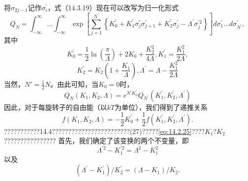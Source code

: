 将\(\sigma_{2j-1}\)记作\(\sigma_{i}^{\prime}\)，式（14.3.19）现在可以改写为归一化形式
\begin{equation}\tag{14.2.28}\label{eq:14.2.28}
Q _ { N } = \int _ { - \infty } ^{\infty} \ldots \int _ { - \infty } ^{\infty} \exp \left[ \sum _ { j = 1 } ^{N ^ { \prime} } \left\{ K _ { 0 } ^{\prime} + K _ { 1 } ^{\prime} \sigma _ { j } ^{\prime} \sigma _ { j + 1 } ^{\prime} + K _ { 2 } ^{\prime} \sigma _ { j } ^{\prime} - \Lambda ^{\prime} \sigma _ { j } ^{\prime 2} \right\} \right] d \sigma _ { 1 } ^{\prime} \ldots d \sigma _ { N ^{\prime} } ^{\prime} ,
\end{equation}
其中
\begin{equation}\tag{14.2.29}\label{eq:14.2.29}
K _ { 0 } ^{\prime} = \frac { 1 } { 2 } \ln \left( \frac { \pi } { \Lambda } \right) + 2 K _ { 0 } + \frac { K _ { 2 } ^{2} } { 4 \Lambda } ,  K _ { 1 } ^{\prime} = \frac { K _ { 1 } ^{2} } { 2 \Lambda } ,
\end{equation}
\begin{equation}\tag{14.2.30}\label{eq:14.2.30}
K _ { 2 } ^{\prime} = K _ { 2 } \left( 1 + \frac { K _ { 1 } } { \Lambda } \right) ,  \Lambda ^{\prime} = \Lambda - \frac { K _ { 1 } ^{2} } { 2 \Lambda }
\end{equation}
当然，\(N' = \frac{1}{2}N\)。由此可知，当\(K_0 = 0\)时，
\begin{equation}\tag{14.2.31}\label{eq:14.2.31}
Q _ { N } ( K _ { 1 } , K _ { 2 } , \Lambda ) = e ^{N ^ { \prime} K _ { 0 } ^{\prime} } Q _ { N ^{\prime} } ( K _ { 1 } ^{\prime} , K _ { 2 } ^{\prime} , \Lambda ^{\prime} )
\end{equation}
因此，对于每旋转子的自由能（以\(kT\)为单位），我们得到了递推关系
\begin{equation}\tag{14.2.32}\label{eq:14.2.32}
f ( K _ { 1 } , K _ { 2 } , \Lambda ) = - \frac { 1 } { 2 } K _ { 0 } ^{\prime} + \frac { 1 } { 2 } f ( K _ { 1 } ^{\prime} , K _ { 2 } ^{\prime} , \Lambda ^{\prime} ) .
\end{equation}
???????????14.4????????????????????????(27)?????\autoref{eq:14.2.25}????\(K_{1}\)?\(K_{2}\)????????????????
首先，我们确定了该变换的两个不变量，即
\begin{equation}\tag{14.2.33}\label{eq:14.2.33}
\Lambda ^{\prime 2} - K _ { 1 } ^{\prime 2} = \Lambda ^{2} - K _ { 1 } ^{2}
\end{equation}
以及
\begin{equation}\tag{14.2.34}\label{eq:14.2.34}
( \Lambda ^{\prime} - K _ { 1 } ^{\prime} ) / K _ { 2 } ^{\prime} = ( \Lambda - K _ { 1 } ) / K _ { 2 } .
\end{equation}
